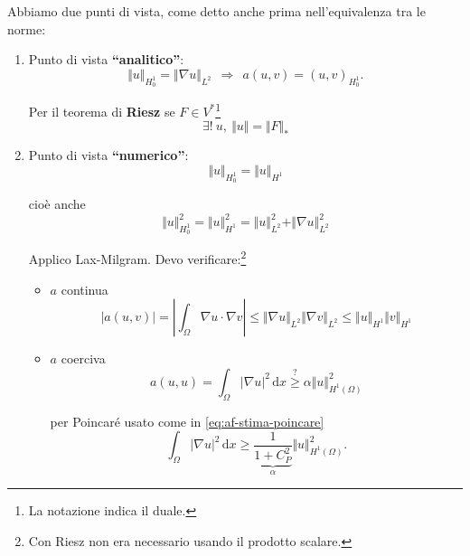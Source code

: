 \documentclass[10pt,a4paper,twoside,openright]{book}
\newcommand{\de}{\,\mathrm d}
\newcommand{\dx}{\de x}
\begin{document}
Abbiamo due punti di vista, come detto anche prima nell'equivalenza tra le norme:
\begin{enumerate}
	\item Punto di vista \textbf{``analitico''}: 
	      \begin{equation*}
	      	\boxed{\Vert u\Vert _{H_{0}^{1}} =\Vert \nabla u\Vert _{L^{2}}} \ \ \Rightarrow \ \ a(u,v) =(u,v)_{H_{0}^{1}} .
	      \end{equation*}
	      
	      Per il teorema di \textbf{Riesz }se $\displaystyle F\in V^{*}$\footnote{La notazione indica il duale.}
	      \begin{equation*}
	      	\exists !\ u,\ \Vert u\Vert =\Vert F\Vert _{*}
	      \end{equation*}
	\item Punto di vista \textbf{``numerico''}:
	      \begin{equation*}
	      	\boxed{\Vert u\Vert _{H_{0}^{1}} =\Vert u\Vert _{H^{1}}}
	      \end{equation*}
	      
	      cioè anche
	      \begin{equation*}
	      	\Vert u\Vert _{H_{0}^{1}}^{2} =\Vert u\Vert _{H^{1}}^{2} =\Vert u\Vert _{L^{2}}^{2} +\Vert \nabla u\Vert _{L^{2}}^{2}
	      \end{equation*}
	      
	      Applico Lax-Milgram. Devo verificare:\footnote{Con Riesz non era necessario usando il prodotto scalare.}
	      \begin{itemize}
	      	\item $a$ continua
	      	      \begin{equation*}
	      	      	| a(u,v)| =\left| \int _{\Omega } \nabla u\cdotp \nabla v\right| \leqslant \Vert \nabla u\Vert _{L^{2}}\Vert \nabla v\Vert _{L^{2}} \leqslant \Vert u\Vert _{H^{1}}\Vert v\Vert _{H^{1}}
	      	      \end{equation*}
	      	\item $a$ coerciva
	      	      \begin{equation*}
	      	      	a(u,u) =\int _{\Omega }| \nabla u| ^{2} \dx\overset{?}{\geqslant } \alpha \Vert u\Vert _{H^{1}(\Omega)}^{2}
	      	      \end{equation*}
	      	      
	      	      per Poincaré usato come in \eqref{eq:af-stima-poincare}
	      	      \begin{equation*}
	      	      	\int _{\Omega }| \nabla u| ^{2} \dx\geqslant \underbrace{\frac{1}{1+C_{P}^{2}}}_{\alpha}\Vert u\Vert _{H^{1}(\Omega)}^{2} .
	      	      \end{equation*}
	      \end{itemize}
\end{enumerate}
\end{document}
